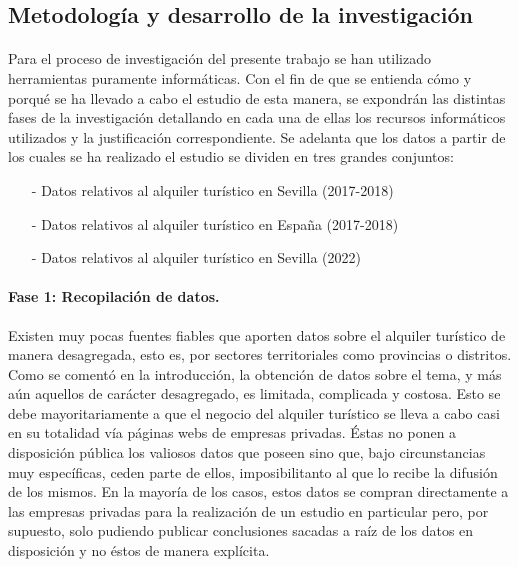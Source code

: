 \documentclass[a4paper,10pt]{article}
\begin{document}
\begin{multicols}{2}
        \clearpage

        \section{Metodología y desarrollo de la investigación}

            \paragraph*{}
            Para el proceso de investigación del presente trabajo se han utilizado herramientas puramente informáticas. Con el fin de que se entienda cómo y 
            porqué se ha llevado a cabo el estudio de esta manera, se expondrán las distintas fases de la investigación detallando en cada una de ellas los recursos 
            informáticos utilizados y la justificación correspondiente. Se adelanta que los datos a partir de los cuales se ha realizado el estudio se dividen
            en tres grandes conjuntos:

            \begin{itemize}
                    
                \item[-] Datos relativos al alquiler turístico en Sevilla (2017-2018)
                \item[-] Datos relativos al alquiler turístico en España (2017-2018)
                \item[-] Datos relativos al alquiler turístico en Sevilla (2022)
            
            \end{itemize} 

            \paragraph*{\textbf{Fase 1: Recopilación de datos.}}
            Existen muy pocas fuentes fiables que aporten datos sobre el alquiler turístico de manera desagregada, esto es, 
            por sectores territoriales como provincias o distritos.
            Como se comentó en la introducción, la obtención de datos sobre el tema, y más aún aquellos de carácter desagregado, es limitada, complicada
            y costosa. Esto se debe mayoritariamente a que el negocio del alquiler turístico se lleva a cabo casi en su totalidad vía páginas webs de empresas
            privadas. Éstas no ponen a disposición pública los valiosos datos que poseen sino que, bajo circunstancias muy específicas, ceden parte de ellos, imposibilitanto al que lo recibe la difusión de los mismos. En la mayoría de los casos, estos datos se compran directamente a las empresas privadas para 
            la realización de un estudio en particular pero, por supuesto, solo pudiendo publicar conclusiones sacadas a raíz de los datos en disposición y no éstos 
            de manera explícita. \\


\end{multicols}
\end{document}
